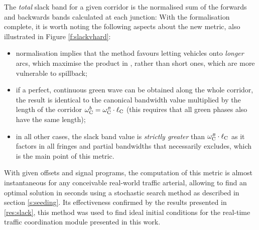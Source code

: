 The \emph{total} slack band for a given corridor is the normalised sum of the forwards and backwards bands calculated at each junction:
With the formalisation complete, it is worth noting the following aspects about the new metric, also illustrated in Figure \ref{f:slackvhard}:
\begin{itemize}
\item normalisation implies that the method favours letting vehicles onto \emph{longer} arcs, which maximise the product in , rather than short ones, which are more vulnerable to spillback;
\item if a perfect, continuous green wave can be obtained along the whole corridor, the result is identical to the canonical bandwidth value multiplied by the length of the corridor 
$\omega_{\mathrm{C}}^{\scriptstyle{b}} = \omega_{\mathrm{C}}^{\scriptscriptstyle{B}} \cdot \ell_{\mathrm{C}}$ (this requires that all green phases also have the same length);
\item in all other cases, the slack band value is \emph{strictly greater} than 
$\omega_{\mathrm{C}}^{\scriptscriptstyle{B}} \cdot \ell_{\mathrm{C}}$ as it factors in all fringes and partial bandwidths that  necessarily excludes, which is the main point of this metric.
\end{itemize}


With given offsets and signal programs, the computation of this metric is almost instantaneous for any conceivable real-world traffic arterial, allowing to find an optimal solution in seconds using a stochastic search method as described in section \ref{s:seeding}. Its effectiveness confirmed by the results presented in \ref{res:slack}, this method was used to find ideal initial conditions for the real-time traffic coordination module presented in this work.